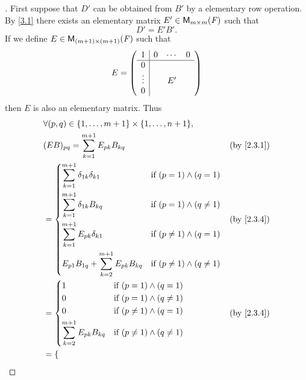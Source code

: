 \begin{proof}[]
	First suppose that \(D'\) can be obtained from \(B'\) by a elementary row operation.
	By \cref{3.1} there exists an elementary matrix \(E' \in \ms[m][m][\F]\) such that
	\[
		D' = E' B'.
	\]
	If we define \(E \in \ms[(m + 1)][(m + 1)][\F]\) such that
	\[
		E = \left\lparen\begin{array}{c|ccc}
				1      & 0 & \cdots & 0 \\
				\hline
				0      &   &        &   \\
				\vdots &   & E'     &   \\
				0      &   &        &
			\end{array}\right\rparen
	\]
	then \(E\) is also an elementary matrix.
	Thus
	\begin{align*}
		 & \forall (p, q) \in \set{1, \dots, m + 1} \times \set{1, \dots, n + 1},                                             \\
		 & (E B)_{p q} = \sum_{k = 1}^{m + 1} E_{p k} B_{k q}                                                 &  & \by{2.3.1} \\
		 & = \begin{dcases}
			     \sum_{k = 1}^{m + 1} \delta_{1 k} \delta_{k 1}         & \text{if } (p = 1) \land (q = 1)       \\
			     \sum_{k = 1}^{m + 1} \delta_{1 k} B_{k q}              & \text{if } (p = 1) \land (q \neq 1)    \\
			     \sum_{k = 1}^{m + 1} E_{p k} \delta_{k 1}              & \text{if } (p \neq 1) \land (q = 1)    \\
			     E_{p 1} B_{1 q} + \sum_{k = 2}^{m + 1} E_{p k} B_{k q} & \text{if } (p \neq 1) \land (q \neq 1)
		     \end{dcases} &  & \by{2.3.4}                  \\
		 & = \begin{dcases}
			     1                                    & \text{if } (p = 1) \land (q = 1)       \\
			     0                                    & \text{if } (p = 1) \land (q \neq 1)    \\
			     0                                    & \text{if } (p \neq 1) \land (q = 1)    \\
			     \sum_{k = 2}^{m + 1} E_{p k} B_{k q} & \text{if } (p \neq 1) \land (q \neq 1)
		     \end{dcases}                   &  & \by{2.3.4}                                    \\
		 & = \begin{dcases}

\end{dcases}
\end{align*}
\end{proof}
